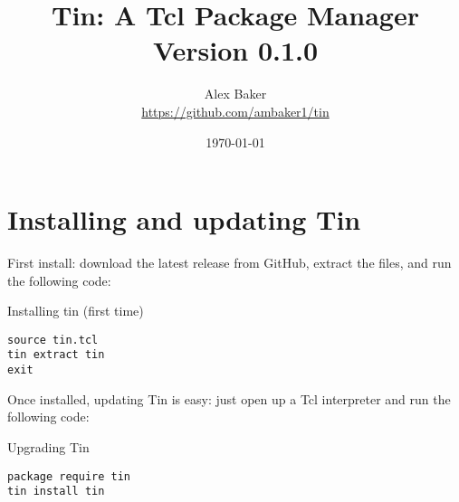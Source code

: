 \documentclass{article}
\title{\Huge Tin: A Tcl Package Manager\\\small Version 0.1.0}
\author{Alex Baker\\\small\hyperlink{https://github.com/ambaker1/tin}{https://github.com/ambaker1/tin}}
\date{\small\today}
\renewcommand{\^}[1]{\textsuperscript{#1}}
\renewcommand{\_}[1]{\textsubscript{#1}}
\begin{document}
\maketitle
\clearpage
\section{Installing and updating Tin}
First install: download the latest release from GitHub, extract the files, and run the following code:
\begin{example}{Installing tin (first time)}
\begin{lstlisting}
source tin.tcl
tin extract tin
exit
\end{lstlisting}
\end{example}
Once installed, updating Tin is easy: just open up a Tcl interpreter and run the following code:
\begin{example}{Upgrading Tin}
\begin{lstlisting}
package require tin
tin install tin
\end{lstlisting}
\end{example}
\clearpage
\end{document}
